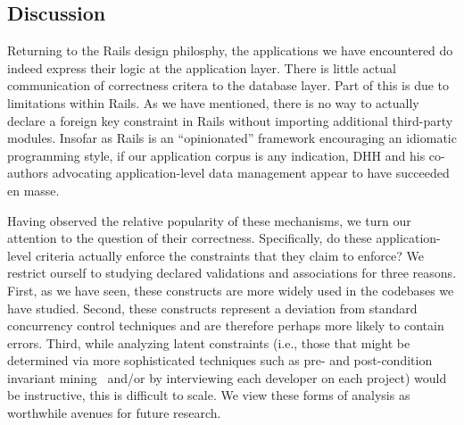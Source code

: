 \subsection{Discussion}

Returning to the Rails design philosphy, the applications we have
encountered do indeed express their logic at the application
layer. There is little actual communication of correctness critera to
the database layer. Part of this is due to limitations within
Rails. As we have mentioned, there is no way to actually declare a
foreign key constraint in Rails without importing additional
third-party modules. Insofar as Rails is an ``opinionated'' framework
encouraging an idiomatic programming style, if our application corpus
is any indication, DHH and his co-authors advocating application-level
data management appear to have succeeded en masse.

Having observed the relative popularity of these mechanisms, we turn
our attention to the question of their correctness. Specifically, do
these application-level criteria actually enforce the constraints that
they claim to enforce? We restrict ourself to studying declared
validations and associations for three reasons. First, as we have
seen, these constructs are more widely used in the codebases we have
studied. Second, these constructs represent a deviation from standard
concurrency control techniques and are therefore perhaps more likely
to contain errors. Third, while analyzing latent constraints (i.e.,
those that might be determined via more sophisticated techniques such
as pre- and post-condition invariant
mining~\cite{writes-forest,redblue-new} and/or by interviewing each
developer on each project) would be instructive, this is difficult to
scale. We view these forms of analysis as worthwhile avenues for
future research.
